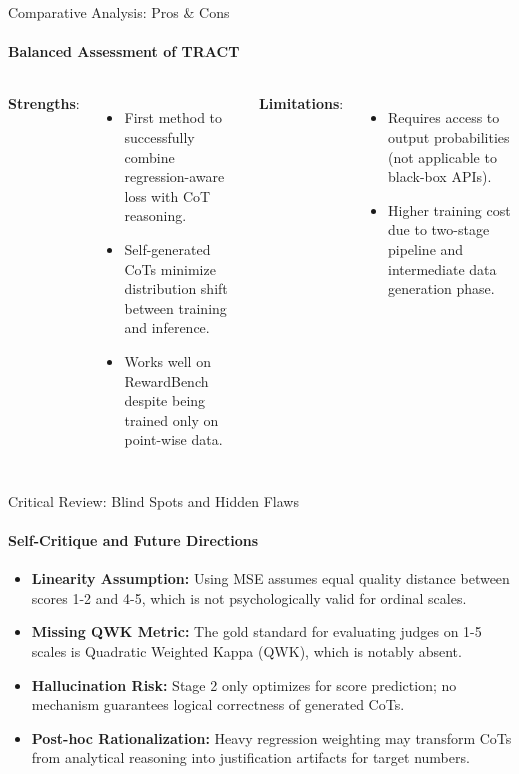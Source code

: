 \documentclass[10pt]{beamer}
\begin{document}
	\begin{frame}{Comparative Analysis: Pros \& Cons}
		\framesubtitle{Balanced Assessment of TRACT}
		\begin{columns}
			\textbf{Strengths}:
			\begin{itemize}
				\item First method to successfully combine regression-aware loss with CoT reasoning.
				\item Self-generated CoTs minimize distribution shift between training and inference.
				\item Works well on RewardBench despite being trained only on point-wise data.
			\end{itemize}
			\textbf{Limitations}:
			\begin{itemize}
				\item Requires access to output probabilities (not applicable to black-box APIs).
				\item Higher training cost due to two-stage pipeline and intermediate data generation phase.
			\end{itemize}
		\end{columns}
	\end{frame}
	
	\begin{frame}{Critical Review: Blind Spots and Hidden Flaws}
		\framesubtitle{Self-Critique and Future Directions}
		\begin{itemize}
			\item \textbf{Linearity Assumption:} Using MSE assumes equal quality distance between scores 1-2 and 4-5, which is not psychologically valid for ordinal scales.
			\item \textbf{Missing QWK Metric:} The gold standard for evaluating judges on 1-5 scales is Quadratic Weighted Kappa (QWK), which is notably absent.
			\item \textbf{Hallucination Risk:} Stage 2 only optimizes for score prediction; no mechanism guarantees logical correctness of generated CoTs.
			\item \textbf{Post-hoc Rationalization:} Heavy regression weighting may transform CoTs from analytical reasoning into justification artifacts for target numbers.
		\end{itemize}
	\end{frame}
	
\end{document}

